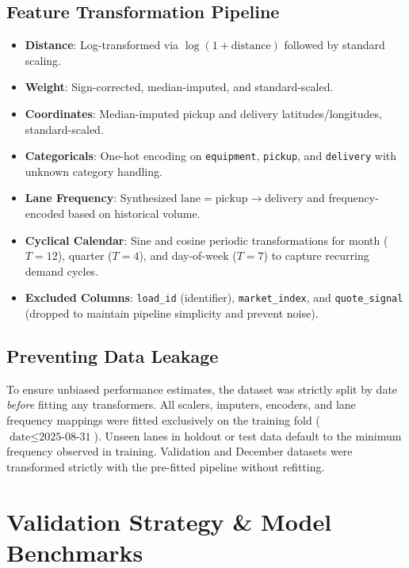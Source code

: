 \documentclass[11pt,a4paper]{article}
\begin{document}
\subsection{Feature Transformation Pipeline}
\begin{itemize}
    \item \textbf{Distance}: Log-transformed via $\log(1 + \text{distance})$ followed by standard scaling.
    \item \textbf{Weight}: Sign-corrected, median-imputed, and standard-scaled.
    \item \textbf{Coordinates}: Median-imputed pickup and delivery latitudes/longitudes, standard-scaled.
    \item \textbf{Categoricals}: One-hot encoding on \texttt{equipment}, \texttt{pickup}, and \texttt{delivery} with unknown category handling.
    \item \textbf{Lane Frequency}: Synthesized $\text{lane} = \text{pickup} \rightarrow \text{delivery}$ and frequency-encoded based on historical volume.
    \item \textbf{Cyclical Calendar}: Sine and cosine periodic transformations for month ($T=12$), quarter ($T=4$), and day-of-week ($T=7$) to capture recurring demand cycles.
    \item \textbf{Excluded Columns}: \texttt{load\_id} (identifier), \texttt{market\_index}, and \texttt{quote\_signal} (dropped to maintain pipeline simplicity and prevent noise).
\end{itemize}

\subsection{Preventing Data Leakage}
To ensure unbiased performance estimates, the dataset was strictly split by date \textit{before} fitting any transformers. All scalers, imputers, encoders, and lane frequency mappings were fitted exclusively on the training fold ($\text{date} \le \text{2025-08-31}$). Unseen lanes in holdout or test data default to the minimum frequency observed in training. Validation and December datasets were transformed strictly with the pre-fitted pipeline without refitting.

\section{Validation Strategy \& Model Benchmarks}
\end{document}
